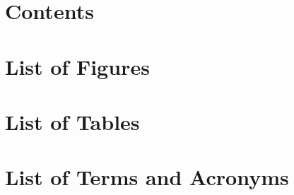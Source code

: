 

\begin{fullwidth}
    {
    
    
    
    }
    
    {
    \hypersetup{linkcolor=black}
    \chapter*{Contents}
    \tableofcontents
    
    \listofplates
    \chapter*{List of Figures}
    \listoffigures
    \chapter*{List of Tables}
    \listoftables
    
    \chapter*{List of Terms and Acronyms}
    \printglossaries
    }
    

\end{fullwidth}